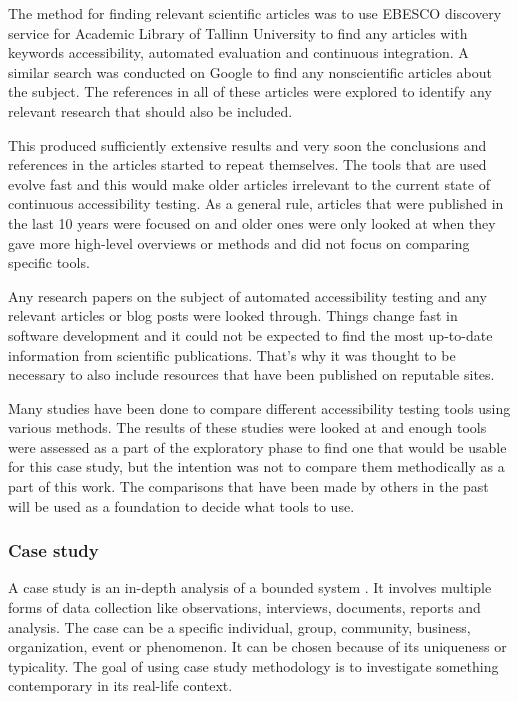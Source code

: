 \documentclass{master_thesis}
\begin{document}
The method for finding relevant scientific articles was to use EBESCO discovery service for Academic Library of Tallinn University to find any articles with keywords accessibility, automated evaluation and continuous integration. A similar search was conducted on Google to find any nonscientific articles about the subject. The references in all of these articles were explored to identify any relevant research that should also be included.

This produced sufficiently extensive results and very soon the conclusions and references in the articles started to repeat themselves. The tools that are used evolve fast and this would make older articles irrelevant to the current state of continuous accessibility testing. As a general rule, articles that were published in the last 10 years were focused on and older ones were only looked at when they gave more high-level overviews or methods and did not focus on comparing specific tools.

Any research papers on the subject of automated accessibility testing and any relevant articles or blog posts were looked through. Things change fast in software development and it could not be expected to find the most up-to-date information from scientific publications. That's why it was thought to be necessary to also include resources that have been published on reputable sites.

Many studies \citep{Alsaeedi2020, Ismailova2022, Sane2021, Vigo2013, RybinKoob2022, Duran2017} have been done to compare different accessibility testing tools using various methods. The results of these studies were looked at and enough tools were assessed as a part of the exploratory phase to find one that would be usable for this case study, but the intention was not to compare them methodically as a part of this work. The comparisons that have been made by others in the past will be used as a foundation to decide what tools to use.

\subsubsection{Case study}

A case study is an in-depth analysis of a bounded system \citep{Range2023}. It involves multiple forms of data collection like observations, interviews, documents, reports and analysis. The case can be a specific individual, group, community, business, organization, event or phenomenon. It can be chosen because of its uniqueness or typicality. The goal of using case study methodology is to investigate something contemporary in its real-life context.
\end{document}
